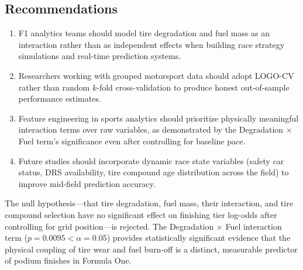 \subsection{Recommendations}

\begin{enumerate}
  \item F1 analytics teams should model tire degradation and fuel mass as an
    interaction rather than as independent effects when building race strategy
    simulations and real-time prediction systems.

  \item Researchers working with grouped motorsport data should adopt
    LOGO-CV rather than random $k$-fold cross-validation to produce honest
    out-of-sample performance estimates.

  \item Feature engineering in sports analytics should prioritize physically
    meaningful interaction terms over raw variables, as demonstrated by the
    Degradation $\times$ Fuel term's significance even after controlling for
    baseline pace.

  \item Future studies should incorporate dynamic race state variables
    (safety car status, DRS availability, tire compound age distribution
    across the field) to improve mid-field prediction accuracy.
\end{enumerate}

The null hypothesis---that tire degradation, fuel mass, their interaction,
and tire compound selection have no significant effect on finishing tier
log-odds after controlling for grid position---is rejected. The Degradation
$\times$ Fuel interaction term ($p = 0.0095 < \alpha = 0.05$) provides
statistically significant evidence that the physical coupling of tire wear
and fuel burn-off is a distinct, measurable predictor of podium finishes in
Formula One.
